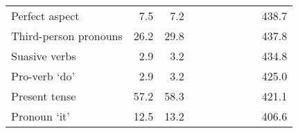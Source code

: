 \begin{table}[!t]
\begin{tabular*}{\linewidth}{@{\extracolsep{\fill}}lrrrrrrrrr}
Perfect aspect & 7.5 & 7.2 & {\cellcolor[HTML]{F4A582}{\textcolor[HTML]{000000}{62\%}}} & {\cellcolor[HTML]{F4A582}{\textcolor[HTML]{000000}{60\%}}} & {\cellcolor[HTML]{D1E5F0}{\textcolor[HTML]{000000}{121\%}}} & {\cellcolor[HTML]{D1E5F0}{\textcolor[HTML]{000000}{111\%}}} & {\cellcolor[HTML]{F7F7F7}{\textcolor[HTML]{000000}{96\%}}} & {\cellcolor[HTML]{F7F7F7}{\textcolor[HTML]{000000}{92\%}}} & 438.7 \\ 
Third-person pronouns & 26.2 & 29.8 & {\cellcolor[HTML]{F7F7F7}{\textcolor[HTML]{000000}{91\%}}} & {\cellcolor[HTML]{F7F7F7}{\textcolor[HTML]{000000}{91\%}}} & {\cellcolor[HTML]{F7F7F7}{\textcolor[HTML]{000000}{108\%}}} & {\cellcolor[HTML]{F7F7F7}{\textcolor[HTML]{000000}{104\%}}} & {\cellcolor[HTML]{D1E5F0}{\textcolor[HTML]{000000}{123\%}}} & {\cellcolor[HTML]{D1E5F0}{\textcolor[HTML]{000000}{120\%}}} & 437.8 \\ 
Suasive verbs & 2.9 & 3.2 & {\cellcolor[HTML]{F7F7F7}{\textcolor[HTML]{000000}{98\%}}} & {\cellcolor[HTML]{D1E5F0}{\textcolor[HTML]{000000}{116\%}}} & {\cellcolor[HTML]{FDDBC7}{\textcolor[HTML]{000000}{89\%}}} & {\cellcolor[HTML]{F7F7F7}{\textcolor[HTML]{000000}{90\%}}} & {\cellcolor[HTML]{92C5DE}{\textcolor[HTML]{000000}{141\%}}} & {\cellcolor[HTML]{92C5DE}{\textcolor[HTML]{000000}{137\%}}} & 434.8 \\ 
Pro-verb ‘do’ & 2.9 & 3.2 & {\cellcolor[HTML]{D6604D}{\textcolor[HTML]{FFFFFF}{25\%}}} & {\cellcolor[HTML]{D6604D}{\textcolor[HTML]{FFFFFF}{26\%}}} & {\cellcolor[HTML]{F4A582}{\textcolor[HTML]{000000}{60\%}}} & {\cellcolor[HTML]{F4A582}{\textcolor[HTML]{000000}{59\%}}} & {\cellcolor[HTML]{D1E5F0}{\textcolor[HTML]{000000}{115\%}}} & {\cellcolor[HTML]{F7F7F7}{\textcolor[HTML]{000000}{109\%}}} & 425.0 \\ 
Present tense & 57.2 & 58.3 & {\cellcolor[HTML]{FDDBC7}{\textcolor[HTML]{000000}{82\%}}} & {\cellcolor[HTML]{FDDBC7}{\textcolor[HTML]{000000}{76\%}}} & {\cellcolor[HTML]{F7F7F7}{\textcolor[HTML]{000000}{99\%}}} & {\cellcolor[HTML]{F7F7F7}{\textcolor[HTML]{000000}{100\%}}} & {\cellcolor[HTML]{D1E5F0}{\textcolor[HTML]{000000}{119\%}}} & {\cellcolor[HTML]{D1E5F0}{\textcolor[HTML]{000000}{116\%}}} & 421.1 \\ 
Pronoun ‘it’ & 12.5 & 13.2 & {\cellcolor[HTML]{FDDBC7}{\textcolor[HTML]{000000}{88\%}}} & {\cellcolor[HTML]{F7F7F7}{\textcolor[HTML]{000000}{92\%}}} & {\cellcolor[HTML]{F7F7F7}{\textcolor[HTML]{000000}{105\%}}} & {\cellcolor[HTML]{F7F7F7}{\textcolor[HTML]{000000}{105\%}}} & {\cellcolor[HTML]{F7F7F7}{\textcolor[HTML]{000000}{108\%}}} & {\cellcolor[HTML]{F7F7F7}{\textcolor[HTML]{000000}{105\%}}} & 406.6 \\ 

\end{tabular*}
\end{table}
